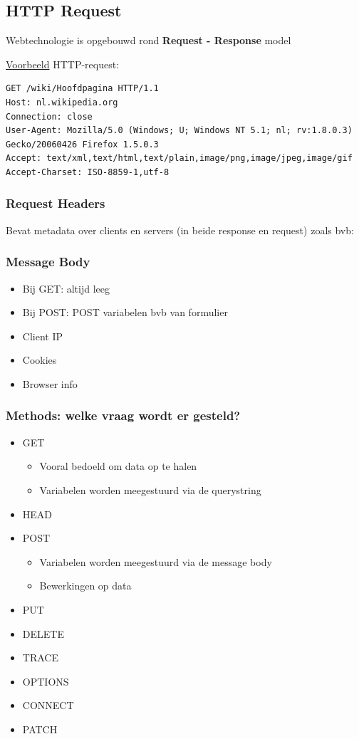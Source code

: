 \documentclass{article}
\newcommand{\bold}[1]{\textbf{#1}}
\begin{document}
\subsection{HTTP Request}
Webtechnologie is opgebouwd rond \bold{Request - Response} model

\underline{Voorbeeld} HTTP-request:

\begin{lstlisting}
GET /wiki/Hoofdpagina HTTP/1.1
Host: nl.wikipedia.org
Connection: close
User-Agent: Mozilla/5.0 (Windows; U; Windows NT 5.1; nl; rv:1.8.0.3) Gecko/20060426 Firefox 1.5.0.3
Accept: text/xml,text/html,text/plain,image/png,image/jpeg,image/gif
Accept-Charset: ISO-8859-1,utf-8
\end{lstlisting}

\subsubsection{Request Headers}
Bevat metadata over clients en servers (in beide response en request) zoals bvb:
\subsubsection{Message Body}
\begin{itemize}
    \item Bij GET: altijd leeg
    \item Bij POST: POST variabelen bvb van formulier
\end{itemize}
\begin{itemize}
    \item Client IP
    \item Cookies
    \item Browser info
\end{itemize}

\subsubsection{Methods: welke vraag wordt er gesteld?}
\begin{itemize}
    \item GET
    \begin{itemize}
        \item Vooral bedoeld om data op te halen
        \item Variabelen worden meegestuurd via de querystring
    \end{itemize}
    \item HEAD 
    \item POST 
    \begin{itemize}
        \item Variabelen worden meegestuurd via de message body
        \item Bewerkingen op data
    \end{itemize}
    \item PUT
    \item DELETE 
    \item TRACE
    \item OPTIONS 
    \item CONNECT
    \item PATCH
\end{itemize}
\end{document}
